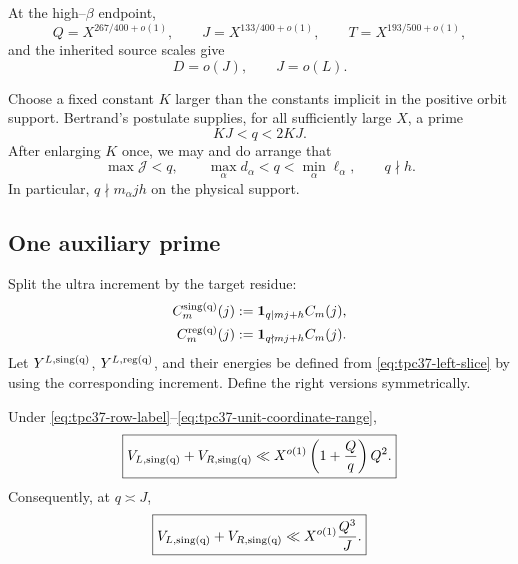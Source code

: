 At the high--\(\beta\) endpoint,
\begin{equation}
 Q=X^{267/400+o(1)},\qquad
 J=X^{133/400+o(1)},\qquad
 T=X^{193/500+o(1)},
 \label{eq:tpc37-endpoint-scales}
\end{equation}
and the inherited source scales give
\begin{equation}
 D=o(J),\qquad J=o(L).
 \label{eq:tpc37-source-order}
\end{equation}

Choose a fixed constant \(K\) larger than the constants implicit in the
positive orbit support.  Bertrand's postulate supplies, for all
sufficiently large \(X\), a prime
\begin{equation}
 KJ<q<2KJ.
 \label{eq:tpc37-orbit-prime}
\end{equation}
After enlarging \(K\) once, we may and do arrange that
\begin{equation}
 \max\mathcal J<q,\qquad
 \max_\alpha d_\alpha<q<\min_\alpha\ell_\alpha,
 \qquad q\nmid h.
 \label{eq:tpc37-unit-coordinate-range}
\end{equation}
In particular, \(q\nmid m_\alpha jh\) on the physical support.

\subsection{One auxiliary prime}

Split the ultra increment by the target residue:
\begin{align}
 C_m^{\rm sing(q)}(j)
 &:=\mathbf 1_{q\mid mj+h}C_m(j),
 \label{eq:tpc37-singular-increment}\\
 C_m^{\rm reg(q)}(j)
 &:=\mathbf 1_{q\nmid mj+h}C_m(j).
 \label{eq:tpc37-regular-increment}
\end{align}
Let \(Y^{L,\rm sing(q)}\), \(Y^{L,\rm reg(q)}\), and their energies be
defined from \eqref{eq:tpc37-left-slice} by using the corresponding
increment.  Define the right versions symmetrically.

\begin{theorem}
\label{thm:tpc37-one-prime-face}
Under \eqref{eq:tpc37-row-label}--\eqref{eq:tpc37-unit-coordinate-range},
\begin{equation}
 \boxed{
 V_{L,\rm sing(q)}+V_{R,\rm sing(q)}
 \ll X^{o(1)}\left(1+\frac Qq\right)Q^2.}
 \label{eq:tpc37-one-prime-face-bound}
\end{equation}
Consequently, at \(q\asymp J\),
\begin{equation}
 \boxed{
 V_{L,\rm sing(q)}+V_{R,\rm sing(q)}
 \ll X^{o(1)}\frac{Q^3}{J}.}
 \label{eq:tpc37-one-prime-gate}
\end{equation}
\end{theorem}


